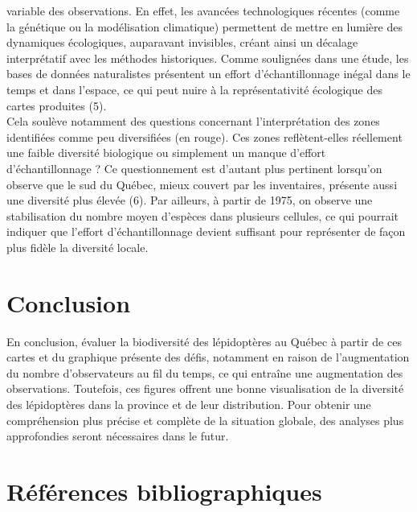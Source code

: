 \documentclass[9pt,twocolumn,twoside,]{pnas-new}
\begin{document}
variable des observations. En effet, les avancées technologiques
récentes (comme la génétique ou la modélisation climatique) permettent
de mettre en lumière des dynamiques écologiques, auparavant invisibles,
créant ainsi un décalage interprétatif avec les méthodes historiques.
Comme soulignées dans une étude, les bases de données naturalistes
présentent un effort d'échantillonnage inégal dans le temps et dans
l'espace, ce qui peut nuire à la représentativité écologique des cartes
produites (5).\\
Cela soulève notamment des questions concernant l'interprétation des
zones identifiées comme peu diversifiées (en rouge). Ces zones
reflètent-elles réellement une faible diversité biologique ou simplement
un manque d'effort d'échantillonnage ? Ce questionnement est d'autant
plus pertinent lorsqu'on observe que le sud du Québec, mieux couvert par
les inventaires, présente aussi une diversité plus élevée (6). Par
ailleurs, à partir de 1975, on observe une stabilisation du nombre moyen
d'espèces dans plusieurs cellules, ce qui pourrait indiquer que l'effort
d'échantillonnage devient suffisant pour représenter de façon plus
fidèle la diversité locale.

\section{Conclusion}\label{conclusion}

En conclusion, évaluer la biodiversité des lépidoptères au Québec à
partir de ces cartes et du graphique présente des défis, notamment en
raison de l'augmentation du nombre d'observateurs au fil du temps, ce
qui entraîne une augmentation des observations. Toutefois, ces figures
offrent une bonne visualisation de la diversité des lépidoptères dans la
province et de leur distribution. Pour obtenir une compréhension plus
précise et complète de la situation globale, des analyses plus
approfondies seront nécessaires dans le futur.

\section{Références
bibliographiques}\label{ruxe9fuxe9rences-bibliographiques}

\showmatmethods
\pnasbreak
\end{document}
